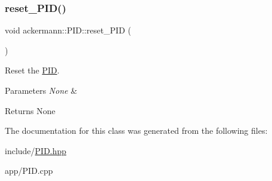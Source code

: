\subsubsection{\texorpdfstring{reset\+\_\+\+P\+I\+D()}{reset\_PID()}}
{\footnotesize\ttfamily void ackermann\+::\+P\+I\+D\+::reset\+\_\+\+P\+ID (\begin{DoxyParamCaption}{ }\end{DoxyParamCaption})}



Reset the \hyperlink{classackermann_1_1_p_i_d}{P\+ID}. 


\begin{DoxyParams}{Parameters}
{\em None} & \\
\hline
\end{DoxyParams}
\begin{DoxyReturn}{Returns}
None 
\end{DoxyReturn}


The documentation for this class was generated from the following files\+:\begin{DoxyCompactItemize}
\item 
include/\hyperlink{_p_i_d_8hpp}{P\+I\+D.\+hpp}\item 
app/P\+I\+D.\+cpp\end{DoxyCompactItemize}
